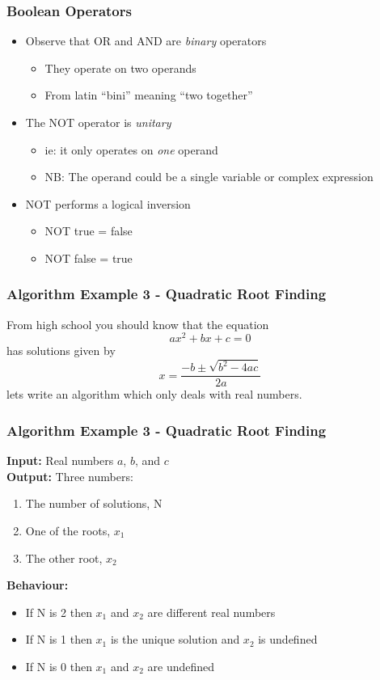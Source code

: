 \documentclass[14pt]{beamer}
\begin{document}
\begin{frame}
\frametitle{Boolean Operators}
\begin{itemize}
\item Observe that OR and AND are \textit{binary} operators
	\begin{itemize}
		\item They operate on two operands
		\item From latin ``bini'' meaning ``two together''
	\end{itemize}
\item The NOT operator is \textit{unitary}
	\begin{itemize}
		\item ie: it only operates on \textit{one} operand
		\item NB: The operand could be a single variable or complex expression
	\end{itemize}
\item NOT performs a logical inversion
	\begin{itemize}
		\item NOT true = false
		\item NOT false = true
	\end{itemize}
\end{itemize}
\end{frame}

\begin{frame}
\frametitle{Algorithm Example 3 - Quadratic Root Finding}
From high school you should know that the equation
\begin{equation}
a x^2 + b x + c = 0
\end{equation}
has solutions given by
\begin{equation}
x = \frac{-b \pm \sqrt{b^2 - 4 a c}}{2a}
\end{equation}
lets write an algorithm which only deals with real numbers.
\end{frame}

\begin{frame}
\frametitle{Algorithm Example 3 - Quadratic Root Finding}
{\footnotesize
\textbf{Input:} Real numbers $a$, $b$, and $c$ \\
\textbf{Output:} Three numbers:
\begin{enumerate}
\item The number of solutions, N
\item One of the roots, $x_1$
\item The other root, $x_2$
\end{enumerate}
\textbf{Behaviour:}
\begin{itemize}
\item If N is 2 then $x_1$ and $x_2$ are different real numbers
\item If N is 1 then $x_1$ is the unique solution and $x_2$ is undefined
\item If N is 0 then $x_1$ and $x_2$ are undefined
\end{itemize} 
} 
\end{frame}
\end{document}
